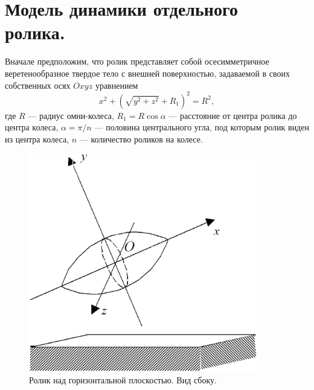 

\section{Модель динамики отдельного ролика.\ }
\label{sec3}
Вначале предположим, что ролик представляет собой осесимметричное 
веретенообразное твердое тело с внешней поверхностью, задаваемой в своих 
собственных осях $Oxyz$ уравнением
\begin{equation}
x^2+\left(\sqrt{y^2+z^2}+R_1\right) ^2=R^2,
\label{3_1}
\end{equation}
где $R$ --- радиус омни-колеса, $R_1=R\cos{\alpha }$ --- расстояние от центра
ролика до центра колеса, $\alpha =\pi /n$ --- половина центрального угла, под
которым ролик виден из центра колеса, $n$ --- количество роликов на колесе.

\begin{figure}[htb]
\centering\includegraphics[width=10cm]{content/parts/3_friction/nd/Roller.eps}
\caption{Ролик над горизонтальной плоскостью. Вид сбоку.}
\label{Roller}
\end{figure}

